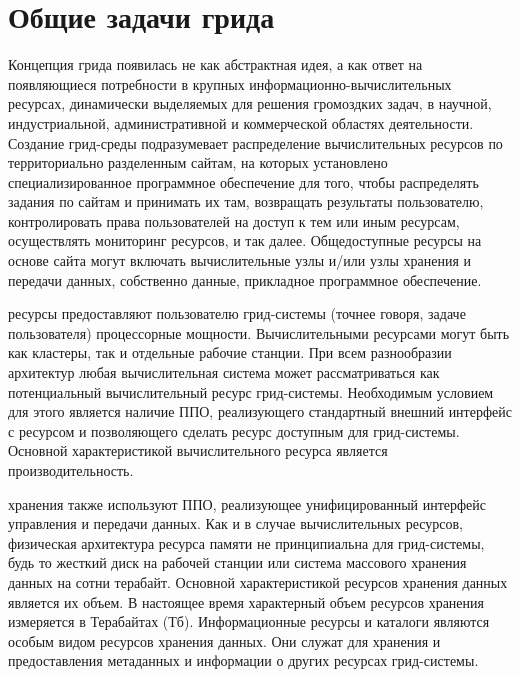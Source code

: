\documentclass[och, referat]{SCWorks}
\begin{document}
\section{Общие задачи грида}
 
Концепция грида появилась не как абстрактная идея, а как ответ на появляющиеся потребности в крупных информационно-вычислительных ресурсах, динамически выделяемых для решения громоздких задач, в научной, индустриальной, административной и коммерческой областях деятельности. Создание грид-среды подразумевает распределение вычислительных ресурсов по территориально разделенным сайтам, на которых установлено специализированное программное обеспечение для того, чтобы распределять задания по сайтам и принимать их там, возвращать результаты пользователю, контролировать права пользователей на доступ к тем или иным ресурсам, осуществлять мониторинг ресурсов, и так далее. Общедоступные ресурсы на основе сайта могут включать вычислительные узлы и/или узлы хранения и передачи данных, собственно данные, прикладное программное обеспечение. 
\newline
 
 ресурсы предоставляют пользователю грид-системы (точнее говоря, задаче пользователя) процессорные мощности. Вычислительными ресурсами могут быть как кластеры, так и отдельные рабочие станции. При всем разнообразии архитектур любая вычислительная система может рассматриваться как потенциальный вычислительный ресурс грид-системы\cite{bib:gcomputing}. Необходимым условием для этого является наличие ППО, реализующего стандартный внешний интерфейс с ресурсом и позволяющего сделать ресурс доступным для грид-системы. Основной характеристикой вычислительного ресурса является производительность.
\newline

 хранения также используют ППО, реализующее унифицированный интерфейс управления и передачи данных. Как и в случае вычислительных ресурсов, физическая архитектура ресурса памяти не принципиальна для грид-системы, будь то жесткий диск на рабочей станции или система массового хранения данных на сотни терабайт. Основной характеристикой ресурсов хранения данных является их объем. В настоящее время характерный объем ресурсов хранения измеряется в Терабайтах (Тб). Информационные ресурсы и каталоги являются особым видом ресурсов хранения данных. Они служат для хранения и предоставления метаданных и информации о других ресурсах грид-системы. 
\newline
\end{document}
